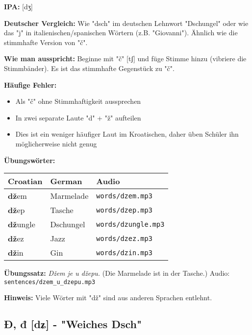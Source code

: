\begin{tcolorbox}[breakable, colback=lightblue!30, colframe=croatianblue, title=\textbf{Dž, dž}]

\textbf{IPA:} [dʒ]

\textbf{Deutscher Vergleich:}
Wie "dsch" im deutschen Lehnwort "Dschungel" oder wie das "j" in italienischen/spanischen Wörtern (z.B. "Giovanni"). Ähnlich wie die stimmhafte Version von "č".

\textbf{Wie man ausspricht:}
Beginne mit "č" [tʃ] und füge Stimme hinzu (vibriere die Stimmbänder). Es ist das stimmhafte Gegenstück zu "č".

\textbf{Häufige Fehler:}
\begin{itemize}
    \item Als "č" ohne Stimmhaftigkeit aussprechen
    \item In zwei separate Laute "d" + "ž" aufteilen
    \item Dies ist ein weniger häufiger Laut im Kroatischen, daher üben Schüler ihn möglicherweise nicht genug
\end{itemize}

\textbf{Übungswörter:}
\begin{center}
\small
\begin{tabular}{lll}
\textbf{Croatian} & \textbf{German} & \textbf{Audio} \\
\midrule
\textbf{dž}em & Marmelade & \small\texttt{words/dzem.mp3} \\
\textbf{dž}ep & Tasche & \small\texttt{words/dzep.mp3} \\
\textbf{dž}ungle & Dschungel & \small\texttt{words/dzungle.mp3} \\
\textbf{dž}ez & Jazz & \small\texttt{words/dzez.mp3} \\
\textbf{dž}in & Gin & \small\texttt{words/dzin.mp3} \\
\end{tabular}
\end{center}

\textbf{Übungssatz:}
\textit{Džem je u džepu.}
(Die Marmelade ist in der Tasche.)
Audio: \small\texttt{sentences/dzem\_u\_dzepu.mp3}

\textbf{Hinweis:}
Viele Wörter mit "dž" sind aus anderen Sprachen entlehnt.

\end{tcolorbox}

\subsection{Đ, đ [dʑ] - "Weiches Dsch"}

